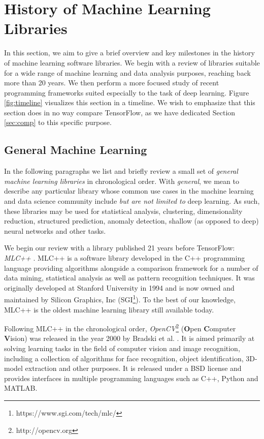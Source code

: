 \section{History of Machine Learning Libraries}\label{sec:history}

In this section, we aim to give a brief overview and key milestones in the
history of machine learning software libraries. We begin with a review of
libraries suitable for a wide range of machine learning and data analysis
purposes, reaching back more than 20 years. We then perform a more focused study
of recent programming frameworks suited especially to the task of deep
learning. Figure \ref{fig:timeline} visualizes this section in a timeline. We
wish to emphasize that this section does in no way compare TensorFlow, as we
have dedicated Section \ref{sec:comp} to this specific purpose.

\subsection{General Machine Learning}\label{sec:history-general}

In the following paragraphs we list and briefly review a small set of
\emph{general machine learning libraries} in chronological order. With
\emph{general}, we mean to describe any particular library whose common
use cases in the machine learning and data science community include \emph{but
  are not limited to} deep learning. As such, these libraries may be used for
statistical analysis, clustering, dimensionality reduction, structured
prediction, anomaly detection, shallow (as opposed to deep) neural networks and
other tasks.

We begin our review with a library published 21 years before TensorFlow:
\emph{MLC++} \cite{mlcpp}. MLC++ is a software library developed in the C++
programming language providing algorithms alongside a comparison framework for a
number of data mining, statistical analysis as well as pattern recognition
techniques. It was originally developed at Stanford University in 1994 and is
now owned and maintained by Silicon Graphics, Inc
(SGI\footnote{https://www.sgi.com/tech/mlc/}). To the best of our knowledge,
MLC++ is the oldest machine learning library still available today.

Following MLC++ in the chronological order,
\emph{OpenCV}\footnote{http://opencv.org} (\textbf{O}pen
\textbf{C}omputer \textbf{V}ision) was released in the year 2000 by Bradski et
al. \cite{opencv}. It is aimed primarily at solving learning tasks in the field
of computer vision and image recognition, including a collection of algorithms
for face recognition, object identification, 3D-model extraction and other
purposes. It is released under a BSD license and provides interfaces in multiple
programming languages such as C++, Python and MATLAB.


